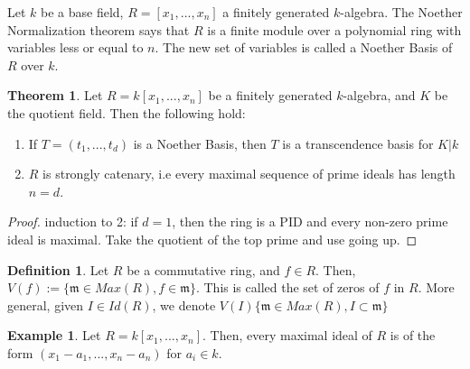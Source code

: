 \documentclass{article}
\theoremstyle{definition}
\newtheorem{theorem}{Theorem}[section]
\theoremstyle{definition}
\theoremstyle{definition}
\theoremstyle{definition}
\theoremstyle{definition}
\newtheorem{definition}{Definition}[section]
\theoremstyle{definition}
\theoremstyle{definition}
\newtheorem{example}{Example}[section]
\begin{document}
Let $k$ be a base field, $R=[x_1,...,x_n]$ a finitely generated $k$-algebra. The Noether Normalization theorem says that $R$ is a finite module over a polynomial ring with variables less or equal to $n$. The new set of variables is called a Noether Basis of $R$ over $k$. 



\begin{tcolorbox}[colback=red!5!white,colframe=red!30!white]
\begin{theorem}
Let $R=k[x_1,...,x_n]$ be a finitely generated $k$-algebra, and $K$ be the quotient field. Then the following hold:
\begin{enumerate}
    \item If $T=(t_1,...,t_d)$ is a Noether Basis, then $T$ is a transcendence basis for $K|k$
    \item $R$ is strongly catenary, i.e every maximal sequence of prime ideals has length $n=d$. 
\end{enumerate}
\end{theorem}
\end{tcolorbox}
\begin{proof}
    induction to 2: if $d=1$, then the ring is a PID and every non-zero prime ideal is maximal. Take the quotient of the top prime and use going up. 
\end{proof}


\begin{tcolorbox}[colback=purple!5!white,colframe=purple!75!black]
\begin{definition}
Let $R$ be a commutative ring, and $f\in R$. Then, $V(f):=\{\mathfrak{m}\in Max(R), f\in \mathfrak{m}\}$. This is called the set of zeros of $f$ in $R$. More general, given $I\in Id(R)$, we denote $V(I)\{\mathfrak{m}\in Max(R), I\subset \mathfrak{m}\}$
\end{definition}
\end{tcolorbox}

\begin{tcolorbox}[colback=yellow!5!white,colframe=yellow!30!white]
\begin{example}
Let $R=k[x_1,...,x_n]$. Then, every maximal ideal of $R$ is of the form $(x_1-a_1,...,x_n-a_n)$ for $a_i\in k$. 
\end{example}
\end{tcolorbox}
\end{document}
